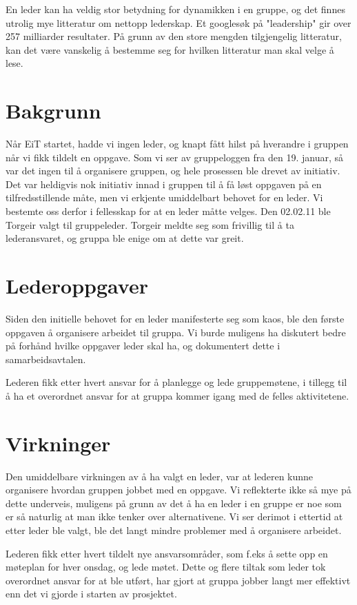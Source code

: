 En leder kan ha veldig stor betydning for dynamikken i en gruppe, og det finnes
utrolig mye litteratur om nettopp lederskap. Et googlesøk på "leadership" gir
over 257 milliarder resultater.
På grunn av den store mengden tilgjengelig litteratur, kan det være vanskelig å bestemme seg for hvilken litteratur man skal velge å lese.

\section{Bakgrunn}
Når EiT startet, hadde vi ingen leder, og knapt fått hilst på hverandre i
gruppen når vi fikk tildelt en oppgave. Som vi ser av gruppeloggen fra den 19.
januar, så var det ingen til å organisere gruppen, og hele prosessen ble drevet
av initiativ. Det var heldigvis nok initiativ innad i gruppen til å få løst
oppgaven på en tilfredsstillende måte, men vi erkjente umiddelbart behovet for
en leder. Vi bestemte oss derfor i fellesskap for at en leder måtte velges.
Den 02.02.11 ble Torgeir valgt til gruppeleder. Torgeir meldte seg som frivillig
til å ta lederansvaret, og gruppa ble enige om at dette var greit.

\section{Lederoppgaver}
Siden den initielle behovet for en leder manifesterte seg som kaos, ble den
første oppgaven å organisere arbeidet til gruppa.
Vi burde muligens ha diskutert bedre på forhånd hvilke oppgaver leder skal ha,
og dokumentert dette i samarbeidsavtalen.

Lederen fikk etter hvert ansvar for å planlegge og lede gruppemøtene,
i tillegg til å ha et overordnet ansvar for at gruppa kommer igang med de felles aktivitetene.

\section{Virkninger}
Den umiddelbare virkningen av å ha valgt en leder, var at lederen kunne organisere hvordan gruppen jobbet med en oppgave. 
Vi reflekterte ikke så mye på dette underveis, 
muligens på grunn av det å ha en leder i en gruppe er noe som er så naturlig at man ikke tenker over alternativene. 
Vi ser derimot i ettertid at etter leder ble valgt, ble det langt mindre problemer med å organisere arbeidet.

Lederen fikk etter hvert tildelt nye ansvarsområder, som f.eks å sette opp en
møteplan for hver onsdag, og lede møtet. Dette og flere tiltak som leder tok
overordnet ansvar for at ble utført, har gjort at gruppa jobber langt mer
effektivt enn det vi gjorde i starten av prosjektet.

